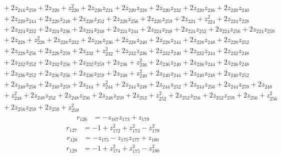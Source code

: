 \begin{align*}
&\quad  + 2z_{216}z_{259} + 2z_{220} + z_{220}^{2} + 2z_{220}z_{224} + 2z_{220}z_{228} + 2z_{220}z_{232} + 2z_{220}z_{236} + 2z_{220}z_{240} \\
&\quad  + 2z_{220}z_{244} + 2z_{220}z_{248} + 2z_{220}z_{252} + 2z_{220}z_{256} + 2z_{220}z_{259} + 2z_{224} + z_{224}^{2} + 2z_{224}z_{228} \\
&\quad  + 2z_{224}z_{232} + 2z_{224}z_{236} + 2z_{224}z_{240} + 2z_{224}z_{244} + 2z_{224}z_{248} + 2z_{224}z_{252} + 2z_{224}z_{256} + 2z_{224}z_{259} \\
&\quad  + 2z_{228} + z_{228}^{2} + 2z_{228}z_{232} + 2z_{228}z_{236} + 2z_{228}z_{240} + 2z_{228}z_{244} + 2z_{228}z_{248} + 2z_{228}z_{252} \\
&\quad  + 2z_{228}z_{256} + 2z_{228}z_{259} + 2z_{232} + z_{232}^{2} + 2z_{232}z_{236} + 2z_{232}z_{240} + 2z_{232}z_{244} + 2z_{232}z_{248} \\
&\quad  + 2z_{232}z_{252} + 2z_{232}z_{256} + 2z_{232}z_{259} + 2z_{236} + z_{236}^{2} + 2z_{236}z_{240} + 2z_{236}z_{244} + 2z_{236}z_{248} \\
&\quad  + 2z_{236}z_{252} + 2z_{236}z_{256} + 2z_{236}z_{259} + 2z_{240} + z_{240}^{2} + 2z_{240}z_{244} + 2z_{240}z_{248} + 2z_{240}z_{252} \\
&\quad  + 2z_{240}z_{256} + 2z_{240}z_{259} + 2z_{244} + z_{244}^{2} + 2z_{244}z_{248} + 2z_{244}z_{252} + 2z_{244}z_{256} + 2z_{244}z_{259} + 2z_{248} \\
&\quad  + z_{248}^{2} + 2z_{248}z_{252} + 2z_{248}z_{256} + 2z_{248}z_{259} + 2z_{252} + z_{252}^{2} + 2z_{252}z_{256} + 2z_{252}z_{259} + 2z_{256} + z_{256}^{2} \\
&\quad  + 2z_{256}z_{259} + 2z_{259} + z_{259}^{2}
\end{align*}
\begin{align*}
r_{126} &= -z_{167}z_{173} + z_{179}
\end{align*}
\begin{align*}
r_{127} &= -1 + z_{172}^{2} + z_{173}^{2} - z_{179}^{2}
\end{align*}
\begin{align*}
r_{128} &= -z_{175} - z_{175}z_{177} + z_{180}
\end{align*}
\begin{align*}
r_{129} &= -1 + z_{174}^{2} + z_{175}^{2} - z_{180}^{2}
\end{align*}
